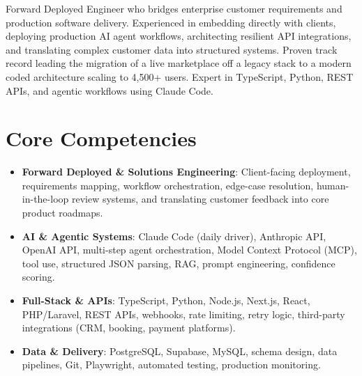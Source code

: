 \documentclass[10pt,a4paper,sans]{moderncv}
\begin{document}
\makecvtitle
\vspace{-12pt}

\small{Forward Deployed Engineer who bridges enterprise customer requirements and production software delivery. Experienced in embedding directly with clients, deploying production AI agent workflows, architecting resilient API integrations, and translating complex customer data into structured systems. Proven track record leading the migration of a live marketplace off a legacy stack to a modern coded architecture scaling to 4,500+ users. Expert in TypeScript, Python, REST APIs, and agentic workflows using Claude Code.}
\vspace{2pt}

\section{Core Competencies}
\vspace{1pt}
\begin{itemize}
\item \textbf{Forward Deployed \& Solutions Engineering}: Client-facing deployment, requirements mapping, workflow orchestration, edge-case resolution, human-in-the-loop review systems, and translating customer feedback into core product roadmaps.
\item \textbf{AI \& Agentic Systems}: Claude Code (daily driver), Anthropic API, OpenAI API, multi-step agent orchestration, Model Context Protocol (MCP), tool use, structured JSON parsing, RAG, prompt engineering, confidence scoring.
\item \textbf{Full-Stack \& APIs}: TypeScript, Python, Node.js, Next.js, React, PHP/Laravel, REST APIs, webhooks, rate limiting, retry logic, third-party integrations (CRM, booking, payment platforms).
\item \textbf{Data \& Delivery}: PostgreSQL, Supabase, MySQL, schema design, data pipelines, Git, Playwright, automated testing, production monitoring.
\end{itemize}
\vspace{3pt}

\end{document}
